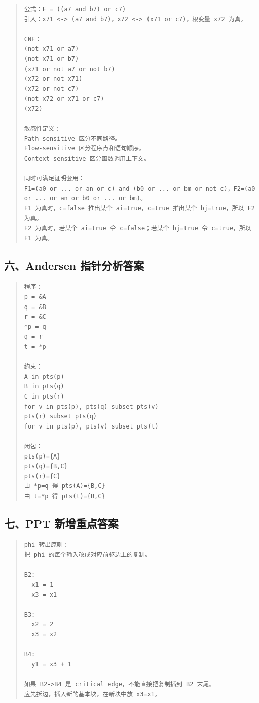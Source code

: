\documentclass[UTF8,zihao=-4]{ctexart}
\begin{document}
\begin{quote}
\footnotesize
\begin{verbatim}
公式：F = ((a7 and b7) or c7)
引入：x71 <-> (a7 and b7)，x72 <-> (x71 or c7)，根变量 x72 为真。

CNF：
(not x71 or a7)
(not x71 or b7)
(x71 or not a7 or not b7)
(x72 or not x71)
(x72 or not c7)
(not x72 or x71 or c7)
(x72)

敏感性定义：
Path-sensitive 区分不同路径。
Flow-sensitive 区分程序点和语句顺序。
Context-sensitive 区分函数调用上下文。

同时可满足证明套用：
F1=(a0 or ... or an or c) and (b0 or ... or bm or not c)，F2=(a0 or ... or an or b0 or ... or bm)。
F1 为真时，c=false 推出某个 ai=true，c=true 推出某个 bj=true，所以 F2 为真。
F2 为真时，若某个 ai=true 令 c=false；若某个 bj=true 令 c=true，所以 F1 为真。
\end{verbatim}
\end{quote}



\subsection{六、Andersen 指针分析答案}


\begin{quote}
\footnotesize
\begin{verbatim}
程序：
p = &A
q = &B
r = &C
*p = q
q = r
t = *p

约束：
A in pts(p)
B in pts(q)
C in pts(r)
for v in pts(p), pts(q) subset pts(v)
pts(r) subset pts(q)
for v in pts(p), pts(v) subset pts(t)

闭包：
pts(p)={A}
pts(q)={B,C}
pts(r)={C}
由 *p=q 得 pts(A)={B,C}
由 t=*p 得 pts(t)={B,C}
\end{verbatim}
\end{quote}



\subsection{七、PPT 新增重点答案}


\begin{quote}
\footnotesize
\begin{verbatim}
phi 转出原则：
把 phi 的每个输入改成对应前驱边上的复制。

B2:
  x1 = 1
  x3 = x1

B3:
  x2 = 2
  x3 = x2

B4:
  y1 = x3 + 1

如果 B2->B4 是 critical edge，不能直接把复制插到 B2 末尾。
应先拆边，插入新的基本块，在新块中放 x3=x1。
\end{verbatim}
\end{quote}
\end{document}
